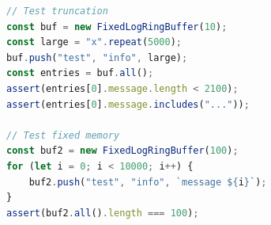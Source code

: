 \begin{lstlisting}[language=TypeScript]
// Test truncation
const buf = new FixedLogRingBuffer(10);
const large = "x".repeat(5000);
buf.push("test", "info", large);
const entries = buf.all();
assert(entries[0].message.length < 2100);
assert(entries[0].message.includes("..."));

// Test fixed memory
const buf2 = new FixedLogRingBuffer(100);
for (let i = 0; i < 10000; i++) {
    buf2.push("test", "info", `message ${i}`);
}
assert(buf2.all().length === 100);
\end{lstlisting}
